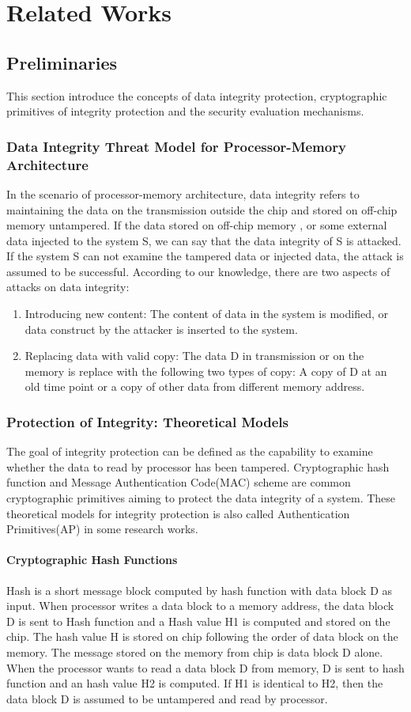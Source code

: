 \documentclass{article}
\begin{document}
\section{Related Works} 
\subsection{Preliminaries}
This section introduce the concepts of data integrity protection, cryptographic primitives of integrity protection and the security evaluation mechanisms.
\subsubsection{Data Integrity Threat Model for Processor-Memory Architecture}
In the scenario of processor-memory architecture, data integrity refers to maintaining the data on the transmission outside the chip and stored on off-chip memory untampered. If the data stored on off-chip memory , or some external data injected to the system S, we can say that the data integrity of S is attacked. If the system S can not examine the tampered data or injected data, the attack is assumed to be successful. According to our knowledge, there are two aspects of attacks on data integrity:
\begin{enumerate}
	\item Introducing new content: The content of data in the system is modified, or data construct by the attacker is inserted to the system.
	\item Replacing data with valid copy: The data D in transmission or on the memory is replace with the following two types of copy: A copy of D at an old time point or a copy of other data from different memory address.
\end{enumerate}

\subsubsection{Protection of Integrity: Theoretical Models}
The goal of integrity protection can be defined as the capability to examine whether the data to read by processor has been tampered. Cryptographic hash function and Message Authentication Code(MAC) scheme are common cryptographic primitives aiming to protect the data integrity of a system. These theoretical models for integrity protection is also called Authentication Primitives(AP) in some research works.

\paragraph{Cryptographic Hash Functions}
Hash is a short message block computed by hash function with data block D as input.
When processor writes a data block to a memory address, the data block D is sent to Hash function and a Hash value H1 is computed and stored on the chip. The hash value H is stored on chip following the order of data block on the memory. The message stored on the memory from chip is data block D alone.
When the processor wants to read a data block D from memory, D is sent to hash function and an hash value H2 is computed. If H1 is identical to H2, then the data block D is assumed to be untampered and read by processor.
\end{document}
